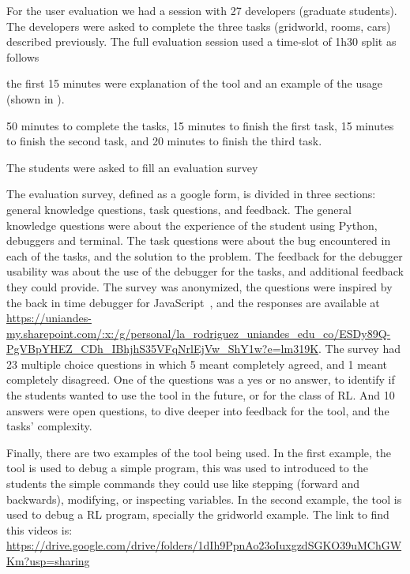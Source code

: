 For the user evaluation we had a session with 27 developers (\ie graduate students). 
The developers were asked to complete the three tasks (\ie gridworld, rooms, cars) described previously. The full evaluation session used a time-slot of 1h30 split as follows 
\begin{enumerate*}[label=(\arabic*)]
\item the first 15 minutes were explanation of the tool and an example of the usage (shown in ).
\item 50 minutes to complete the tasks, 15 minutes to finish the first task, 15 minutes to finish the second task, and  20 minutes to finish the third task. 
\item The students were asked to fill an evaluation survey 
\end{enumerate*}
The evaluation survey, defined as a google form, is divided in three sections: general knowledge questions, task questions, and feedback.
The general knowledge questions were about the experience of the student using Python, debuggers and 
terminal. The task questions were about the bug encountered in each of the tasks, and the solution 
to the problem. The feedback for the debugger usability was about the use of the debugger for the tasks, 
and additional feedback they could provide. The survey was anonymized, the questions were inspired by the 
back in time debugger for JavaScript~\cite{leger23}, and the responses are available 
at \url{https://uniandes-my.sharepoint.com/:x:/g/personal/la_rodriguez_uniandes_edu_co/ESDy89Q-PgVBpYHEZ_CDh_IBhjhS35VFqNrlEjVw_ShY1w?e=lm319K}.
The survey had 23 multiple choice questions in which 5 meant completely agreed, and 1 meant completely disagreed.
One of the questions was a yes or no answer, to identify if the students wanted to use the tool in the future,
or for the class of \ac{RL}. And 10 answers were open questions, to dive deeper into feedback for the tool,
and the tasks' complexity.

Finally, there are two examples of the tool being used. In the first 
example, the tool is used to debug a simple program, this was used to introduced to the students 
the simple commands they could use like stepping (forward and backwards), modifying, or inspecting 
variables. In the second example, the tool is used to debug a \ac{RL} program, specially 
the gridworld example. The link to find this videos is: \url{https://drive.google.com/drive/folders/1dIh9PpnAo23oIuxgzdSGKO39uMChGWKm?usp=sharing} 



\endinput

